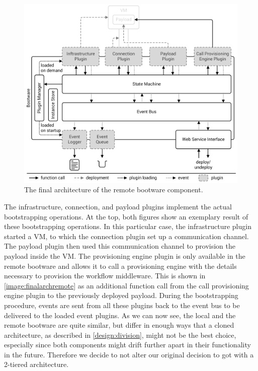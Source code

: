 \begin{figure}[!htbp]
	\centering
	\includegraphics[resolution=600]{design/assets/final_architecture_remote}
	\caption{The final architecture of the remote bootware component.}
	\label{image:finalarchremote}
\end{figure}

The infrastructure, connection, and payload plugins implement the actual bootstrapping operations.
At the top, both figures show an exemplary result of these bootstrapping operations.
In this particular case, the infrastructure plugin started a VM, to which the connection plugin set up a communication channel.
The payload plugin then used this communication channel to provision the payload inside the VM.
The provisioning engine plugin is only available in the remote bootware and allows it to call a provisioning engine with the details necessary to provision the workflow middleware.
This is shown in \autoref{image:finalarchremote} as an additional function call from the call provisioning engine plugin to the previously deployed payload.
During the bootstrapping procedure, events are sent from all these plugins back to the event bus to be delivered to the loaded event plugins.
As we can now see, the local and the remote bootware are quite similar, but differ in enough ways that a cloned architecture, as described in \autoref{design:division}, might not be the best choice, especially since both components might drift further apart in their functionality in the future.
Therefore we decide to not alter our original decision to got with a 2-tiered architecture.
